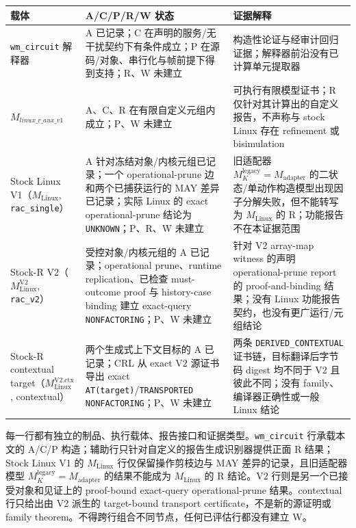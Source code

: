 \documentclass[
  11pt,
  a4paper,
]{ctexart}
\begin{document}
\begin{longtable}[]{@{}>{\raggedright\arraybackslash}p{}>{\raggedright\arraybackslash}p{}>{\raggedright\arraybackslash}p{}@{}}
\toprule\noalign{}
载体 & A/C/P/R/W 状态 & 证据解释 \\
\midrule\noalign{}
\endhead
\bottomrule\noalign{}
\endlastfoot
\texttt{wm\_circuit} 解释器 & A 已记录；C
在声明的服务/无干扰契约下有条件成立；P
在源码/对象、串行化与帧前提下得到支持；R、W 未建立 &
构造性论证与经审计回归证据；解释器前沿没有已计算单元提取器 \\
\(M_{\mathit{linux\_r\_aux\_v1}}\) & A、C、R
在有限自定义元组内成立；P、W 未建立 & 可执行有限模型证书；R
仅针对其计算出的自定义报告，不声称与 stock Linux 存在 refinement 或
bisimulation \\
Stock Linux V1（\(M_{\mathrm{Linux}}\), \texttt{rac\_single}） & A
针对冻结对象/内核元组已记录；一个 operational-prune 边和两个已捕获运行的
MAY 差异已记录；实际 Linux 的 exact operational-prune 结论为
\texttt{UNKNOWN}；P、R、W 未建立 & 旧适配器
\(M_K^{\mathrm{legacy}}=M_{\mathrm{adapter}}\)
的二状态/单动作构造模型出现因子分解失败，但不能转写为
\(M_{\mathrm{Linux}}\) 的 R；功能报告不在本证据范围 \\
Stock-R V2（\(M_{\mathrm{Linux}}^{\mathrm{V2}}\), \texttt{rac\_v2}） &
受控对象/内核元组的 A 已记录；operational prune、runtime
replication、已检查 must-outcome proof 与 history-case binding 建立
exact-query \texttt{NONFACTORING}；P、W 未建立 & 针对 V2 array-map
witness 的声明 operational-prune report 的 proof-and-binding 结果；没有
Linux 功能报告契约，也没有更广运行/元组结论 \\
Stock-R contextual target（\(M_{\mathrm{Linux}}^{\mathrm{V2.ctx}}\),
contextual） & 两个生成式上下文目标的 A 已记录；CRL 从 exact V2
源证书导出 exact \texttt{AT(target)}/\texttt{TRANSPORTED}
\texttt{NONFACTORING}；P、W 未建立 & 两条 \texttt{DERIVED\_CONTEXTUAL}
证书链，目标翻译后字节码 digest 均不同于 V2 且彼此不同；没有
family、编译器正确性或一般 Linux 结论 \\
\end{longtable}

每一行都有独立的制品、执行载体、报告接口和证据类型。\texttt{wm\_circuit}
行承载本文的 A/C/P 构造；辅助行只针对自定义的报告生成识别器提供正面 R
结果；Stock Linux V1 的 \(M_{\mathrm{Linux}}\) 行仅保留操作剪枝边与 MAY
差异的记录，且旧适配器模型
\(M_K^{\mathrm{legacy}}=M_{\mathrm{adapter}}\) 的结果不能成为
\(M_{\mathrm{Linux}}\) 的 R 结论。V2 行则是另一个已接受对象和见证上的
proof-bound exact-query operational-prune 结果。contextual 行只给出由 V2
派生的 target-bound transport certificate，不是新的源证明或 family
theorem。不得跨行组合不同节点，任何已评估行都没有建立 W。
\end{document}

